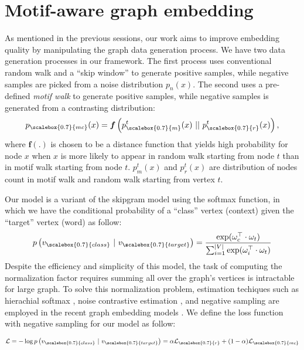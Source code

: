 \documentclass{sig-alternate-05-2015}
\begin{document}
\section{Motif-aware graph embedding}

As mentioned in the previous sessions, our work aims
to improve embedding quality by manipulating the graph
data generation process. We have two data generation processes in 
our framework. The first process uses conventional 
random walk and a ``skip window'' to generate positive
samples, while negative samples are picked from a noise
distribution $p_n(x)$. The second uses a pre-defined 
\emph{motif walk} to generate positive samples, while
negative samples is generated from a contrasting distribution:
\begin{equation} \label{eq:dist}
  p_{\scalebox{0.7}{mc}}(x) = 
    \boldsymbol f\left(p^t_{\scalebox{0.7}{m}}(x) \ || \ p^t_{\scalebox{0.7}{r}}(x)\right),
\end{equation}
where $\boldsymbol f(.)$ is chosen to be a distance function that
yields high probability for node $x$ when $x$ is more
likely to appear in random walk starting from node $t$
than in motif walk starting from node $t$. $p^t_m(x)$ and
$p^t_r(x)$ are distribution of nodes count in motif walk
and random walk starting from vertex $t$. 

Our model is a variant of the skipgram model \cite{w2v}
using the softmax function, in which we have the  
conditional probability of a ``class'' vertex (context) given 
the ``target'' vertex (word) as follow:
\begin{equation} \label{eq:softmax}
  p\left(v_{\scalebox{0.7}{class}} \ | \ v_{\scalebox{0.7}{target}}\right) 
    = \frac{\exp(\omega^\top_c \cdot \omega_t)}{\sum^{|V|}_{i=1} \exp(\omega^\top_i \cdot \omega_t)}
\end{equation}
Despite the efficiency and simplicity of this model,
the task of computing the normalization factor requires
summing all over the graph's vertices is intractable
for large graph. To solve this normalization problem,
estimation techiques such as hierachial softmax \cite{hsoftmax}, 
noise contrastive estimation \cite{nce}, and negative
sampling \cite{w2v} are employed in the recent graph
embedding models \cite{deepwalk, line, platenoid}.
We define the loss function with negative sampling
for our model as follow:

\begin{equation} \label{eq:loss}
  \begin{aligned}
    \mathcal{L} & = -\log p\left(v_{\scalebox{0.7}{class}} \ | \ v_{\scalebox{0.7}{target}}\right)
                  = \alpha \mathcal{L}_{\scalebox{0.7}{r}} + (1-\alpha) \mathcal{L}_{\scalebox{0.7}{mc}} \\
  \end{aligned}
\end{equation}
\end{document}

